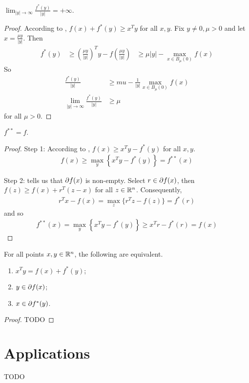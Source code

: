 \begin{theorem}
$\lim_{|y| \to \infty} \frac{f^{*}(y)}{|y|} = +\infty$.
\end{theorem} 

\begin{proof}
According to , $f(x) + f^{*}(y) \ge x^T y $ for all $x, y$. 
Fix $y \neq 0, \mu > 0$ and let $x = \frac{\mu y}{|y|}$.
Then
\begin{align}
f^{*}(y) 
&\ge \left( \frac{\mu y}{|y|} \right)^T y - f(\frac{\mu y}{|y|}) 
&\ge \mu |y| - \max_{x \in B_{\mu}(0)} f(x)
\end{align}
So
\begin{align}
\frac{f^{*}(y)}{|y|} &\ge mu - \frac{1}{|y|} \max_{x \in B_{\mu}(0)} f(x) \\
\lim _{|y| \to \infty} \frac{f^{*}(y)}{|y|} &\ge \mu
\end{align}
for all $\mu > 0$.
\end{proof}

\begin{theorem}
$f^{**} = f$.
\end{theorem}

\begin{proof}
Step 1:
According to , $f(x) \ge x^T y - f^{*}(y)$ for all $x, y$.
\begin{align}
f(x) \ge \max_{y} \left\{ x^T y - f^{*}(y) \right\} = f^{**}(x)
\end{align}

Step 2:
 tells us that $\partial f(x)$ is non-empty.
Select $r \in \partial f(x)$, then $f(z) \ge f(x) + r^T (z- x)$ for all $z \in \mathbb{R}^n$.
Consequently, 
\begin{align}
r^T x - f(x) = \max_{z} \{ r^T z - f(z) \} = f^*(r)
\end{align}
and so
\begin{align}
f^{**}(x) = \max_{y} \left\{ x^T y - f^{*}(y) \right\} \ge x^T r - f^{*}(r) = f(x)
\end{align}
\end{proof}

\begin{theorem}
For all points $x, y \in \mathbb{R}^n$, the following are equivalent.
\begin{enumerate}
    \item $x^T y = f(x) + f^{*}(y)$;
    \item $y \in \partial f(x)$;
    \item $x \in \partial f^{*}(y)$.
\end{enumerate}
\end{theorem}

\begin{proof}
TODO
\end{proof}

\section{Applications}
TODO